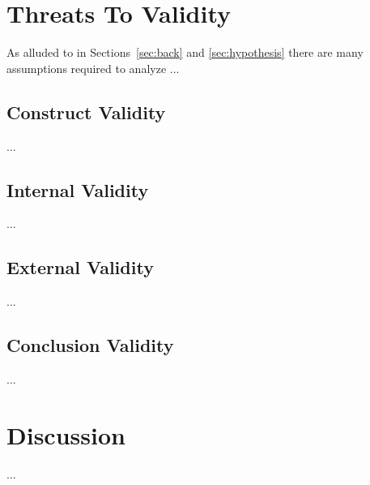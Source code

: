 \documentclass[conference]{IEEEtran}
\begin{document}
\section{Threats To Validity}\label{sec:validity}
As alluded to in Sections~\ref{sec:back} and \ref{sec:hypothesis} there are many assumptions required to analyze ...

\subsection{Construct Validity} %
...

\subsection{Internal Validity} %
...

\subsection{External Validity} %
...

\subsection{Conclusion Validity} %
...

\section{Discussion}\label{sec:discussion}


...
\end{document}
